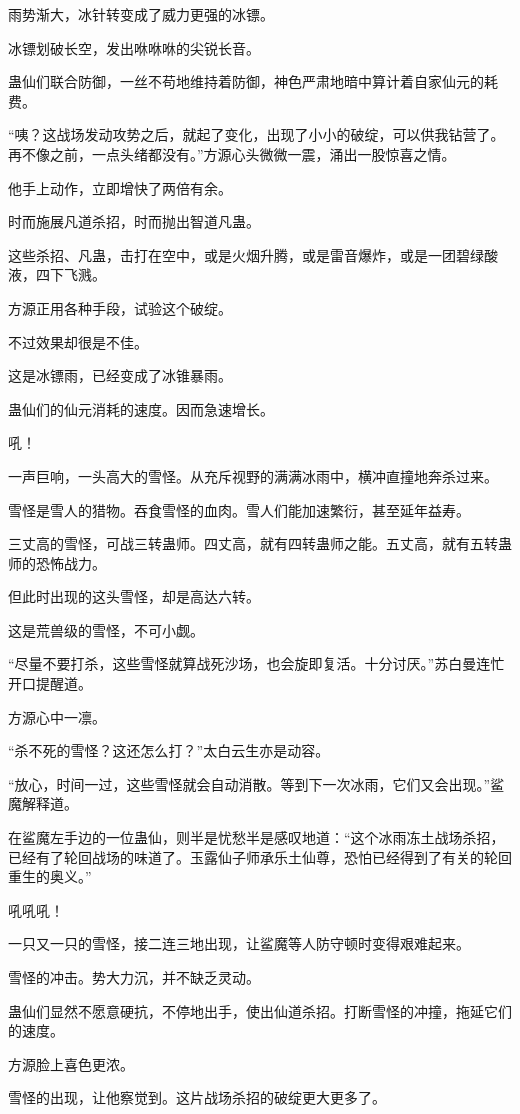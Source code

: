 \begin{this_body}
雨势渐大，冰针转变成了威力更强的冰镖。

冰镖划破长空，发出咻咻咻的尖锐长音。

蛊仙们联合防御，一丝不苟地维持着防御，神色严肃地暗中算计着自家仙元的耗费。

“咦？这战场发动攻势之后，就起了变化，出现了小小的破绽，可以供我钻营了。再不像之前，一点头绪都没有。”方源心头微微一震，涌出一股惊喜之情。

他手上动作，立即增快了两倍有余。

时而施展凡道杀招，时而抛出智道凡蛊。

这些杀招、凡蛊，击打在空中，或是火烟升腾，或是雷音爆炸，或是一团碧绿酸液，四下飞溅。

方源正用各种手段，试验这个破绽。

不过效果却很是不佳。

这是冰镖雨，已经变成了冰锥暴雨。

蛊仙们的仙元消耗的速度。因而急速增长。

吼！

一声巨响，一头高大的雪怪。从充斥视野的满满冰雨中，横冲直撞地奔杀过来。

雪怪是雪人的猎物。吞食雪怪的血肉。雪人们能加速繁衍，甚至延年益寿。

三丈高的雪怪，可战三转蛊师。四丈高，就有四转蛊师之能。五丈高，就有五转蛊师的恐怖战力。

但此时出现的这头雪怪，却是高达六转。

这是荒兽级的雪怪，不可小觑。

“尽量不要打杀，这些雪怪就算战死沙场，也会旋即复活。十分讨厌。”苏白曼连忙开口提醒道。

方源心中一凛。

“杀不死的雪怪？这还怎么打？”太白云生亦是动容。

“放心，时间一过，这些雪怪就会自动消散。等到下一次冰雨，它们又会出现。”鲨魔解释道。

在鲨魔左手边的一位蛊仙，则半是忧愁半是感叹地道：“这个冰雨冻土战场杀招，已经有了轮回战场的味道了。玉露仙子师承乐土仙尊，恐怕已经得到了有关的轮回重生的奥义。”

吼吼吼！

一只又一只的雪怪，接二连三地出现，让鲨魔等人防守顿时变得艰难起来。

雪怪的冲击。势大力沉，并不缺乏灵动。

蛊仙们显然不愿意硬抗，不停地出手，使出仙道杀招。打断雪怪的冲撞，拖延它们的速度。

方源脸上喜色更浓。

雪怪的出现，让他察觉到。这片战场杀招的破绽更大更多了。


\end{this_body}
